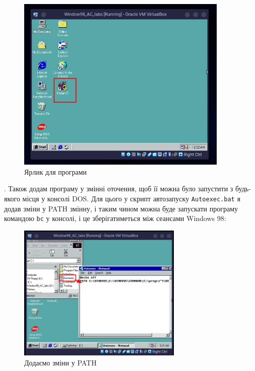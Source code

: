 \begin{figure}[h]
    \centering
    \includegraphics[width=0.9\textwidth]{reports/AC/lab1/assets/29.jpeg}
    \caption{Ярлик для програми}
\end{figure}

. Також додам програму у змінні оточення, щоб її можна було запустити з будь-якого місця у консолі DOS. Для цього у скрипт автозапуску \texttt{Autoexec.bat} я додав зміни у PATH змінну, і таким чином можна буде запускати програму командою \texttt{bc} у консолі, і це зберігатиметься між сеансами Windows 98:

\begin{figure}[h]
    \centering
    \includegraphics[width=0.7\textwidth]{reports/AC/lab1/assets/30.jpeg}
    \caption{Додаємо зміни у PATH}
\end{figure}

